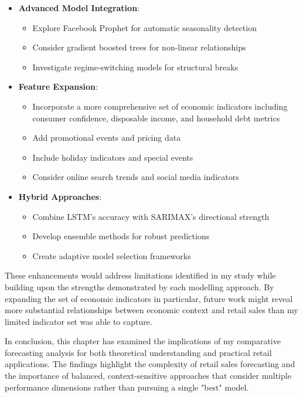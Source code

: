 \documentclass[12pt,a4paper]{report}
\begin{document}
\begin{itemize}
    \item \textbf{Advanced Model Integration}:
    \begin{itemize}
        \item Explore Facebook Prophet for automatic seasonality detection
        \item Consider gradient boosted trees for non-linear relationships
        \item Investigate regime-switching models for structural breaks
    \end{itemize}
    
    \item \textbf{Feature Expansion}:
    \begin{itemize}
        \item Incorporate a more comprehensive set of economic indicators including consumer confidence, disposable income, and household debt metrics
        \item Add promotional events and pricing data
        \item Include holiday indicators and special events
        \item Consider online search trends and social media indicators
    \end{itemize}
    
    \item \textbf{Hybrid Approaches}:
    \begin{itemize}
        \item Combine LSTM's accuracy with SARIMAX's directional strength
        \item Develop ensemble methods for robust predictions
        \item Create adaptive model selection frameworks
    \end{itemize}
\end{itemize}

These enhancements would address limitations identified in my study while building upon the strengths demonstrated by each modelling approach. By expanding the set of economic indicators in particular, future work might reveal more substantial relationships between economic context and retail sales than my limited indicator set was able to capture.

In conclusion, this chapter has examined the implications of my comparative forecasting analysis for both theoretical understanding and practical retail applications. The findings highlight the complexity of retail sales forecasting and the importance of balanced, context-sensitive approaches that consider multiple performance dimensions rather than pursuing a single "best" model.
\end{document}
